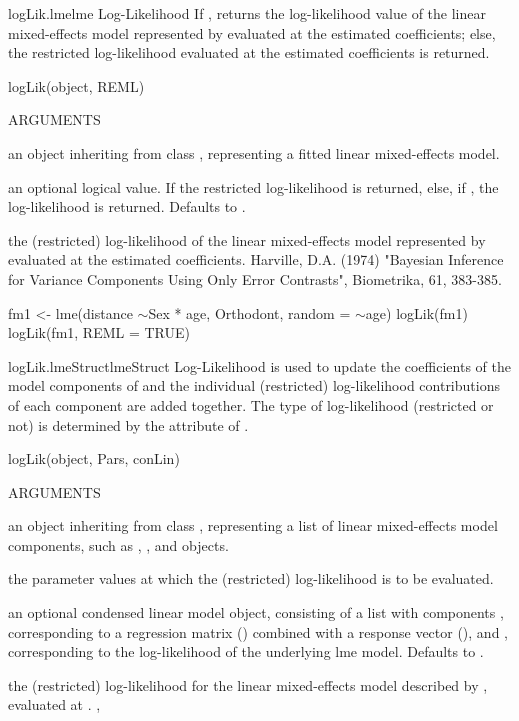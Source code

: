 \documentclass[pdftex]{article} \usepackage{url,graphicx}
\renewcommand{\Twiddle}{\mbox{\(\sim\)}}
\begin{document}
\begin{Helpfile}{logLik.lme}{lme Log-Likelihood}
If , returns the log-likelihood value of the linear
mixed-effects model represented by  evaluated at the
estimated  coefficients; else, the restricted log-likelihood evaluated
at the estimated coefficients is returned.
\begin{Example}
logLik(object, REML)
\end{Example}
\begin{Argument}{ARGUMENTS}
\item[\Co{object:}]
an object inheriting from class , representing
a fitted linear mixed-effects model.
\item[\Co{REML:}]
an optional logical value. If  the restricted
log-likelihood is returned, else, if , the log-likelihood
is returned. Defaults to . 
\end{Argument}
the (restricted) log-likelihood of the linear mixed-effects model
represented by  evaluated at the estimated coefficients.
Harville, D.A. (1974) "Bayesian Inference for Variance Components
Using Only Error Contrasts", Biometrika, 61, 383-385.
\need 15pt
\vspace{-16pt} 
\begin{Example}
fm1 <- lme(distance \Twiddle  Sex * age, Orthodont, random = \Twiddle age)
logLik(fm1)
logLik(fm1, REML = TRUE)
\end{Example}
\end{Helpfile}
\begin{Helpfile}{logLik.lmeStruct}{lmeStruct Log-Likelihood}
 is used to update the coefficients of the model components
of  and the individual (restricted) log-likelihood
contributions of each component are added together. The type of
log-likelihood (restricted or not) is determined by the
 attribute of .
\begin{Example}
logLik(object, Pars, conLin)
\end{Example}
\begin{Argument}{ARGUMENTS}
\item[\Co{object:}]
an object inheriting from class ,
representing a list of linear mixed-effects model components, such as
, , and  objects.
\item[\Co{Pars:}]
the parameter values at which the (restricted)
log-likelihood is to be evaluated.
\item[\Co{conLin:}]
an optional condensed linear model object, consisting of
a list with components , corresponding to a regression
matrix () combined with a response vector (), and 
, corresponding to the log-likelihood of the
underlying lme model. Defaults to .
\end{Argument}
the (restricted) log-likelihood for the linear mixed-effects model
described by , evaluated at .
, 
\end{Helpfile}
\end{document}

